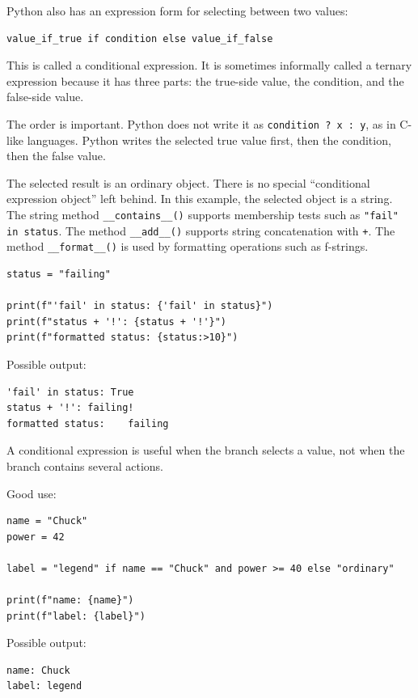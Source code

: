 Python also has an expression form for selecting between two values:

\begin{verbatim}
value_if_true if condition else value_if_false
\end{verbatim}

This is called a conditional expression. It is sometimes informally called a ternary expression because it has three parts: the true-side value, the condition, and the false-side value.

The order is important. Python does not write it as \texttt{condition ? x : y}, as in C-like languages. Python writes the selected true value first, then the condition, then the false value.

The selected result is an ordinary object. There is no special ``conditional expression object'' left behind. In this example, the selected object is a string. The string method \texttt{\_\_contains\_\_()} supports membership tests such as \texttt{"fail" in status}. The method \texttt{\_\_add\_\_()} supports string concatenation with \texttt{+}. The method \texttt{\_\_format\_\_()} is used by formatting operations such as f-strings.

\begin{verbatim}
status = "failing"

print(f"'fail' in status: {'fail' in status}")
print(f"status + '!': {status + '!'}")
print(f"formatted status: {status:>10}")
\end{verbatim}

Possible output:

\begin{verbatim}
'fail' in status: True
status + '!': failing!
formatted status:    failing
\end{verbatim}

A conditional expression is useful when the branch selects a value, not when the branch contains several actions.

Good use:

\begin{verbatim}
name = "Chuck"
power = 42

label = "legend" if name == "Chuck" and power >= 40 else "ordinary"

print(f"name: {name}")
print(f"label: {label}")
\end{verbatim}

Possible output:

\begin{verbatim}
name: Chuck
label: legend
\end{verbatim}

